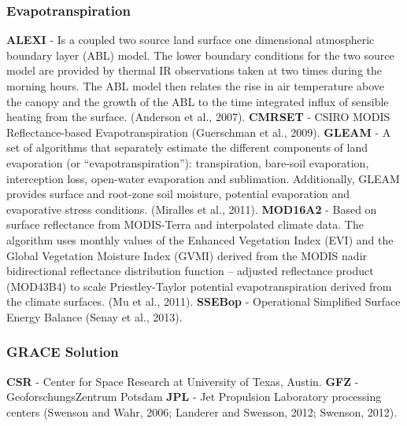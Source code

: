\documentclass{article}%
\begin{document}
%
\subsubsection*{Evapotranspiration}%
\label{ssubsec:Evapotranspiration}%
\textbf{ALEXI} - Is a coupled two source land surface one dimensional atmospheric boundary layer (ABL) model. The lower boundary conditions for the two source model are provided by thermal IR observations taken at two times during the morning hours.  The ABL model then relates the rise in air temperature above the canopy and the growth of the ABL to the time integrated influx of sensible heating from the surface. (Anderson et al., 2007).%
\linebreak%
\textbf{CMRSET} - CSIRO MODIS Reflectance-based Evapotranspiration (Guerschman et al., 2009).%
\linebreak%
\textbf{GLEAM} - A set of algorithms that separately estimate the different components of land evaporation (or “evapotranspiration”): transpiration, bare-soil evaporation, interception loss, open-water evaporation and sublimation. Additionally, GLEAM provides surface and root-zone soil moisture, potential evaporation and evaporative stress conditions. (Miralles et al., 2011).%
\linebreak%
\textbf{MOD16A2} - Based on surface reflectance from MODIS-Terra and interpolated climate data. The algorithm uses monthly values of the Enhanced Vegetation Index (EVI) and the Global Vegetation Moisture Index (GVMI) derived from the MODIS nadir bidirectional reflectance distribution function – adjusted reflectance product (MOD43B4) to scale Priestley-Taylor potential evapotranspiration derived from the climate surfaces. (Mu et al., 2011).%
\linebreak%
\textbf{SSEBop} - Operational Simplified Surface Energy Balance (Senay et al., 2013).%
\linebreak

%
\subsubsection*{GRACE Solution}%
\label{ssubsec:GRACESolution}%
\textbf{CSR} - Center for Space Research at University of Texas, Austin.%
\linebreak%
\textbf{GFZ} - GeoforschungsZentrum Potsdam%
\linebreak%
\textbf{JPL} - Jet Propulsion Laboratory processing centers (Swenson and Wahr, 2006; Landerer and Swenson, 2012; Swenson, 2012).%
\linebreak
\end{document}
